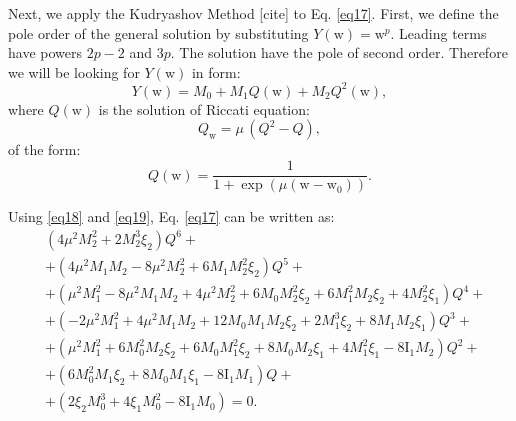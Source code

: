 \documentclass{article}
\begin{document}
                Next, we apply the Kudryashov Method [cite] to Eq. \ref{eq17}.
                First, we define the pole order of the general solution by substituting \(Y\left(\mathrm{w}\right) = \mathrm{w}^{p}\). Leading terms have powers \(2p-2\) and \(3p\). The solution have the pole of second order.
                Therefore we will be looking for \(Y\left(\mathrm{w}\right)\) in form:
                \begin{equation} \label{eq18}
                    Y\left(\mathrm{w}\right) = M_{0} + M_{1}Q\left(\mathrm{w}\right) + M_{2}Q^2\left(\mathrm{w}\right),
                \end{equation}
                where \(Q\left(\mathrm{w}\right)\) is the solution of Riccati equation:
                \begin{equation}\label{eq19}
                    Q_{\mathrm{w}} = \mu\,(Q^{2}-Q),
                \end{equation}
                of the form:
                \begin{equation}\label{eq20}
                    Q(\mathrm{w}) = \frac{1}{1 + \exp\left(\mu(\mathrm{w}-\mathrm{w}_{0})\right)}.
                \end{equation}

                Using \ref{eq18} and \ref{eq19}, Eq. \ref{eq17} can be written as:
                \begin{equation}\label{eq21}
                    \begin{split}
                        &\left(4 \mu^{2} M_{2}^{2}+2 M_{2}^{3} \xi_{2}\right) Q^{6}+\\
                        &+\left(4 \mu^{2} M_{1} M_{2}-8 \mu^{2} M_{2}^{2}+6 M_{1} M_{2}^{2} \xi_{2}\right) Q^{5}+\\
                        &+\left(\mu^{2} M_{1}^{2}-8 \mu^{2} M_{1} M_{2}+4 \mu^{2} M_{2}^{2}+6 M_{0} M_{2}^{2} \xi_{2}+6 M_{1}^{2} M_{2} \xi_{2}+4 M_{2}^{2} \xi_{1}\right) Q^{4}+\\
                        &+\left(-2 \mu^{2} M_{1}^{2}+4 \mu^{2} M_{1} M_{2}+12 M_{0} M_{1} M_{2} \xi_{2}+2 M_{1}^{3} \xi_{2}+8 M_{1} M_{2} \xi_{1}\right) Q^{3}+\\
                        &+\left(\mu^{2} M_{1}^{2}+6 M_{0}^{2} M_{2} \xi_{2}+6 M_{0} M_{1}^{2} \xi_{2}+8 M_{0} M_{2} \xi_{1}+4 M_{1}^{2} \xi_{1}-8 \mathrm{I}_{1} M_{2}\right) Q^{2}+\\
                        &+\left(6 M_{0}^{2} M_{1} \xi_{2}+8 M_{0} M_{1} \xi_{1}-8 \mathrm{I}_{1} M_{1}\right) Q+\\
                        &+\left(2 \xi_{2} M_{0}^{3}+4 \xi_{1} M_{0}^{2}-8 \mathrm{I}_{1} M_{0}\right)=0.
                    \end{split}
                \end{equation}
\end{document}
